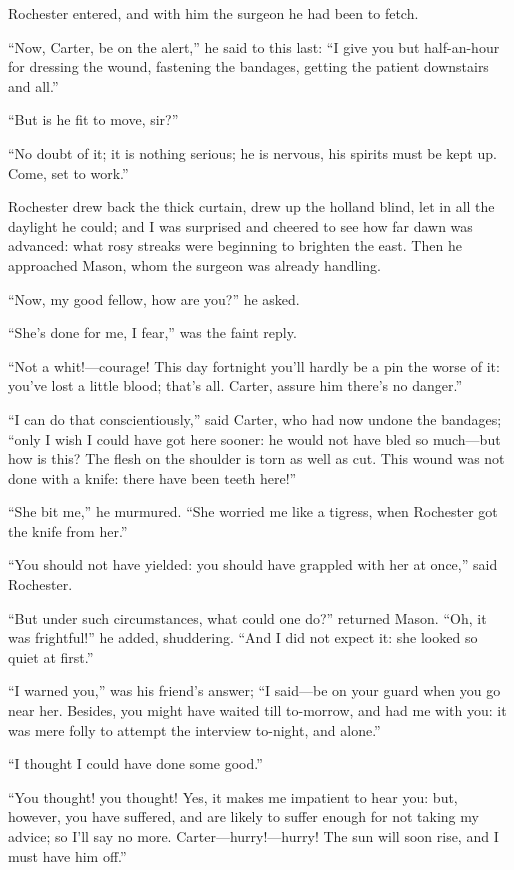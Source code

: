 \Mr{} Rochester entered, and with him the surgeon he had been to fetch.

\enquote{Now, Carter, be on the alert,} he said to this last: \enquote{I
	give you but half-an-hour for dressing the wound, fastening the
	bandages, getting the patient downstairs and all.}

\enquote{But is he fit to move, sir?}

\enquote{No doubt of it; it is nothing serious; he is nervous, his
	spirits must be kept up. Come, set to work.}

\Mr{} Rochester drew back the thick curtain, drew up the holland blind,
let in all the daylight he could; and I was surprised and cheered to see
how far dawn was advanced: what rosy streaks were beginning to brighten
the east. Then he approached Mason, whom the surgeon was already
handling.

\enquote{Now, my good fellow, how are you?} he asked.

\enquote{She's done for me, I fear,} was the faint reply.

\enquote{Not a whit!---courage! This day fortnight you'll hardly be a
	pin the worse of it: you've lost a little blood; that's all. Carter,
	assure him there's no danger.}

\enquote{I can do that conscientiously,} said Carter, who had now undone
the bandages; \enquote{only I wish I could have got here sooner: he
	would not have bled so much---but how is this? The flesh on the
	shoulder is torn as well as cut. This wound was not done with a knife:
	there have been teeth here!}

\enquote{She bit me,} he murmured. \enquote{She worried me like a
	tigress, when Rochester got the knife from her.}

\enquote{You should not have yielded: you should have grappled with her
	at once,} said \Mr{} Rochester.

\enquote{But under such circumstances, what could one do?} returned
Mason. \enquote{Oh, it was frightful!} he added, shuddering.
\enquote{And I did not expect it: she looked so quiet at first.}

\enquote{I warned you,} was his friend's answer; \enquote{I said---be on
	your guard when you go near her. Besides, you might have waited till
	to-morrow, and had me with you: it was mere folly to attempt the
	interview to-night, and alone.}

\enquote{I thought I could have done some good.}

\enquote{You thought! you thought! Yes, it makes me impatient to hear
	you: but, however, you have suffered, and are likely to suffer enough
	for not taking my advice; so I'll say no more.
	Carter---hurry!---hurry! The sun will soon rise, and I must have him
	off.}

